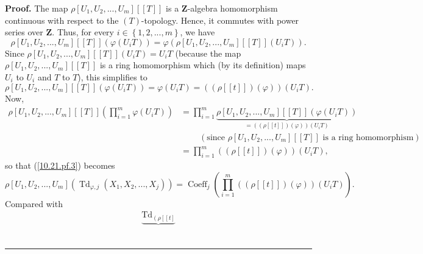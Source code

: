 \documentclass[numbers=enddot,12pt,final,onecolumn,notitlepage]{scrartcl}%
\newenvironment{proof}[1][Proof]{\noindent\textbf{#1.} }{\ \rule{0.5em}{0.5em}}
\begin{document}
\begin{proof}
The map $\rho\left[  U_{1},U_{2},...,U_{m}\right]  \left[  \left[  T\right]
\right]  $ is a $\mathbf{Z}$-algebra homomorphism continuous with respect to
the $\left(  T\right)  $-topology. Hence, it commutes with power series over
$\mathbf{Z}$. Thus, for every $i\in\left\{  1,2,...,m\right\}  $, we have%
\[
\rho\left[  U_{1},U_{2},...,U_{m}\right]  \left[  \left[  T\right]  \right]
\left(  \varphi\left(  U_{i}T\right)  \right)  =\varphi\left(  \rho\left[
U_{1},U_{2},...,U_{m}\right]  \left[  \left[  T\right]  \right]  \left(
U_{i}T\right)  \right)  .
\]
Since $\rho\left[  U_{1},U_{2},...,U_{m}\right]  \left[  \left[  T\right]
\right]  \left(  U_{i}T\right)  =U_{i}T$ (because the map $\rho\left[
U_{1},U_{2},...,U_{m}\right]  \left[  \left[  T\right]  \right]  $ is a ring
homomorphism which (by its definition) maps $U_{i}$ to $U_{i}$ and $T$ to
$T$), this simplifies to%
\[
\rho\left[  U_{1},U_{2},...,U_{m}\right]  \left[  \left[  T\right]  \right]
\left(  \varphi\left(  U_{i}T\right)  \right)  =\varphi\left(  U_{i}T\right)
=\left(  \left(  \rho\left[  \left[  t\right]  \right]  \right)  \left(
\varphi\right)  \right)  \left(  U_{i}T\right)  .
\]
Now,%
\begin{align*}
\rho\left[  U_{1},U_{2},...,U_{m}\right]  \left[  \left[  T\right]  \right]
\left(  \prod\limits_{i=1}^{m}\varphi\left(  U_{i}T\right)  \right)   &
=\prod\limits_{i=1}^{m}\underbrace{\rho\left[  U_{1},U_{2},...,U_{m}\right]
\left[  \left[  T\right]  \right]  \left(  \varphi\left(  U_{i}T\right)
\right)  }_{=\left(  \left(  \rho\left[  \left[  t\right]  \right]  \right)
\left(  \varphi\right)  \right)  \left(  U_{i}T\right)  }\\
&  \ \ \ \ \ \ \ \ \ \ \left(  \text{since }\rho\left[  U_{1},U_{2}%
,...,U_{m}\right]  \left[  \left[  T\right]  \right]  \text{ is a ring
homomorphism}\right) \\
&  =\prod\limits_{i=1}^{m}\left(  \left(  \rho\left[  \left[  t\right]
\right]  \right)  \left(  \varphi\right)  \right)  \left(  U_{i}T\right)  ,
\end{align*}
so that (\ref{10.21.pf.3}) becomes%
\[
\rho\left[  U_{1},U_{2},...,U_{m}\right]  \left(  \operatorname*{Td}%
\nolimits_{\varphi,j}\left(  X_{1},X_{2},...,X_{j}\right)  \right)
=\operatorname*{Coeff}\nolimits_{j}\left(  \prod\limits_{i=1}^{m}\left(
\left(  \rho\left[  \left[  t\right]  \right]  \right)  \left(  \varphi
\right)  \right)  \left(  U_{i}T\right)  \right)  .
\]
Compared with%
\begin{align*}
\underbrace{\operatorname*{Td}\nolimits_{\left(  \rho\left[  \left[  t\right]
}}
\end{align*}
\end{proof}
\end{document}
